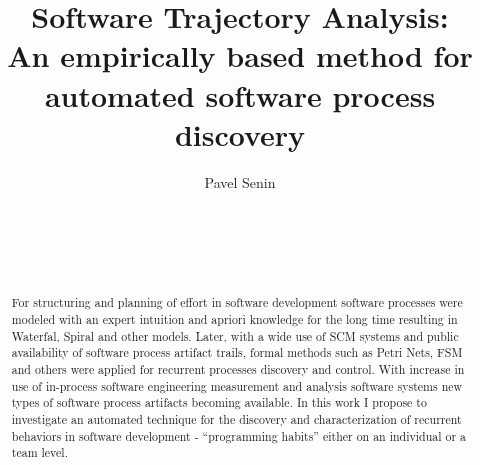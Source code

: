 \documentclass{sig-alternate}
\begin{document}
\title{Software Trajectory Analysis:\\An empirically based method for automated software process discovery}

%
\author{
%
%
\alignauthor Pavel Senin \\
\\
\\
\\
\\
}

\maketitle
\begin{abstract}
For structuring and planning of effort in software development software processes were modeled with an expert intuition and apriori knowledge for the long time resulting in Waterfal, Spiral and other models. Later, with a wide use of SCM systems and public availability of software process artifact trails, formal methods such as Petri Nets, FSM and others were applied for recurrent processes discovery and control. With increase in use of in-process software engineering measurement and analysis software systems new types of software process artifacts becoming available. In this work I propose to investigate an automated technique for the discovery and characterization of recurrent behaviors in software development - ``programming habits'' either on an individual or a team level.
\end{abstract}
\end{document}
